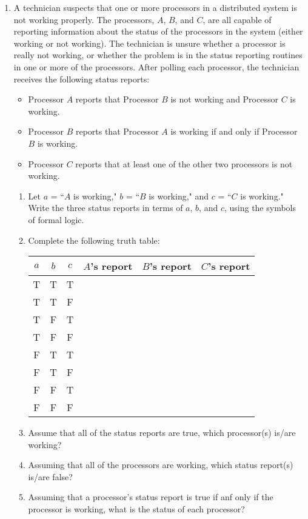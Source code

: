 \documentclass{article}
\begin{document}
\begin{enumerate}
\item A\marginpar{[12]} technician suspects that one or more processors in a distributed system is not working properly. The processors, $A$, $B$, and $C$, are all capable of reporting information about the status of the processors in the system (either working or not working). The technician is unsure whether a processor is really not working, or whether the problem is in the status reporting routines in one or more of the processors. After polling each processor, the technician receives the following status reports:
	\begin{itemize}
	\item Processor $A$ reports that Processor $B$ is not working and Processor $C$ is working.
	\item Processor $B$ reports that Processor $A$ is working if and only if Processor $B$ is working.
	\item Processor $C$ reports that at least one of the other two processors is not working.
	\end{itemize}
	\begin{enumerate}
	\item Let $a$ = ``$A$ is working," $b$ = ``$B$ is working," and $c$ = ``$C$ is working." Write the three status reports in terms of $a$, $b$, and $c$, using the symbols of formal logic.
	\item Complete the following truth table:\\[1ex]
	\begin{tabular}{c|c|c|c|c|c}
	$a$&$b$&$c$&$A$'s report&$B$'s report&$C$'s report\\\hline
	T&T&T&&&\\
	T&T&F&&&\\
	T&F&T&&&\\
	T&F&F&&&\\
	F&T&T&&&\\
	F&T&F&&&\\
	F&F&T&&&\\
	F&F&F&&&
	\end{tabular}
	\item Assume that all of the status reports are true, which processor(s) is/are working?
	\item Assuming that all of the processors are working, which status report(s) is/are false?
	\item Assuming that a processor's status report is true if anf only if the processor is working, what is the status of each processor?
	\end{enumerate}

\end{enumerate}
\end{document}
